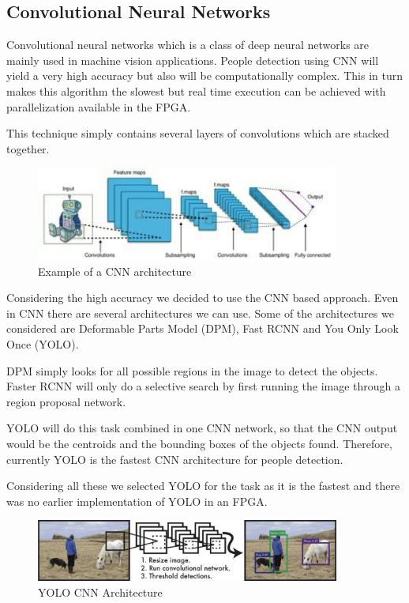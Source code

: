\documentclass[12pt,a4paper]{report}
\begin{document}
\subsection{Convolutional Neural Networks }
Convolutional neural networks which is a class of deep neural networks are mainly used in machine vision applications. People detection using CNN will yield a very high accuracy but also will be computationally complex. This in turn makes this algorithm the slowest but real time execution can be achieved with parallelization available in the FPGA.
\par This technique simply contains several layers of convolutions which are stacked together.
\begin{figure}[H]
\includegraphics[width=10cm]{cnn.jpg}
\centering
\caption{Example of a CNN architecture}
\label{cnn}
\end{figure}
Considering the high accuracy we decided to use the CNN based approach.
Even in CNN there are several architectures we can use. Some of the architectures we considered are Deformable Parts Model (DPM), Fast RCNN and You Only Look Once (YOLO). 
\par DPM simply looks for all possible regions in the image to detect the objects. Faster RCNN will only do a selective search by first running the image through a region proposal network.
\par YOLO will do this task combined in one CNN network, so that the CNN output would be the centroids and the bounding boxes of the objects found. Therefore, currently YOLO is the fastest CNN architecture for people detection. 
\par Considering all these we selected YOLO for the task as it is the fastest and there was no earlier implementation of YOLO in an FPGA.
\begin{figure}[H]
\includegraphics[width=10cm]{yolo.jpg}
\centering
\caption{YOLO\cite{4} CNN Architecture}
\label{yolo}
\end{figure}
\end{document}
